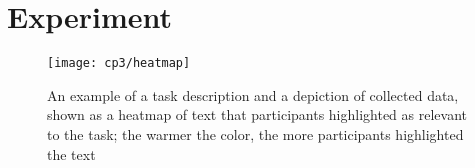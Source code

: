 
\section{Experiment}
\label{cp3:experiment}









\begin{landscape}
    \begin{figure}
        \centering
        \texttt{[image: cp3/heatmap]}
    \caption{An example of a task description and a depiction of collected data, shown as a heatmap of text that participants highlighted as relevant to the task; the warmer the color, the more participants highlighted the text}
    \label{fig:task-highlights-heatmap}
    \end{figure}
\end{landscape}















